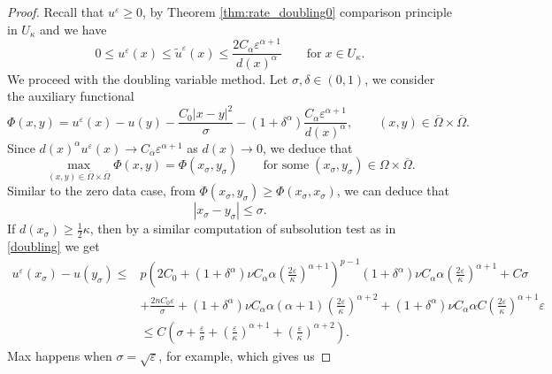 \documentclass[11pt,reqno]{amsart}
\numberwithin{figure}{section}
\theoremstyle{plain}
\theoremstyle{remark}
\numberwithin{equation}{section}
\begin{document}
\begin{proof}
Recall that $u^\varepsilon\geq 0$, by Theorem \ref{thm:rate_doubling0} comparison principle in $U_\kappa$ and  we have
\begin{equation}\label{annulus2}
    0\leq u^\varepsilon(x) \leq \tilde{u}^\varepsilon(x)  \leq \frac{2C_\alpha\varepsilon^{\alpha+1}}{d(x)^{\alpha}} \qquad\text{for}\;x\in U_\kappa.
\end{equation}
We proceed with the doubling variable method. Let $\sigma,\delta\in (0,1)$, we consider the auxiliary functional 
\begin{equation*}
    \Phi(x,y)= u^\varepsilon(x) - u(y) -\frac{C_0|x-y|^2}{\sigma} - (1+\delta^\alpha) \frac{C_\alpha \varepsilon^{\alpha +1}}{d(x)^\alpha}, \qquad (x,y)\in \overline{\Omega}\times \overline{\Omega}.
\end{equation*}
Since $\displaystyle d(x)^\alpha u^\varepsilon(x) \to C_\alpha \varepsilon^{\alpha+1}$ as $d(x) \to 0$, we deduce that
\begin{equation*}
    \max_{(x,y) \in \overline{\Omega} \times \overline{\Omega}} \Phi(x,y) = \Phi(x_\sigma, y_\sigma) \qquad\text{for some}\;(x_\sigma,y_\sigma) \in \Omega \times \overline{\Omega}.
\end{equation*}
Similar to the zero data case, from $\Phi(x_\sigma, y_\sigma) \geq \Phi(x_\sigma, x_\sigma)$, we can deduce that
\begin{equation*}
    \left| x_\sigma - y_\sigma \right| \leq \sigma.  
\end{equation*}
If $ d(x_\sigma) \geq \frac{1}{2}\kappa$, then by a similar  computation of subsolution test as in \eqref{doubling} we get 
\begin{align*}
     u^\varepsilon(x_\sigma) - u(y_\sigma) \leq & p\left(2C_0+(1+\delta^\alpha)\nu C_\alpha \alpha\left( \frac{2\varepsilon}{\kappa}\right)^{\alpha+1}\right)^{p-1}(1+\delta^\alpha) \nu C_\alpha \alpha \left(\frac{2\varepsilon}{\kappa}\right)^{\alpha+1} + C\sigma\nonumber\\
    &+\frac{2nC_0\varepsilon}{\sigma} + (1+\delta^\alpha)\nu C_\alpha \alpha(\alpha+1)\left(\frac{2\varepsilon}{\kappa}\right)^{\alpha+2} + (1+\delta^\alpha)\nu C_\alpha \alpha C \left(\frac{2\varepsilon}{\kappa}\right)^{\alpha+1}\varepsilon\nonumber\\
    &\leq C\left(\sigma + \frac{\varepsilon}{\sigma} + \left(\frac{\varepsilon}{\kappa}\right)^{\alpha+1} + \left(\frac{\varepsilon}{\kappa}\right)^{\alpha+2} \right).
\end{align*}
Max happens when $\sigma = \sqrt{\varepsilon}$, for example, which gives us  

\end{proof}
\end{document}
